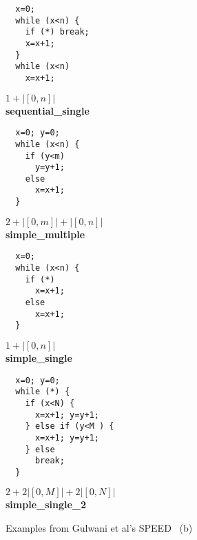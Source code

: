 \documentclass[nocopyrightspace,preprint]{sigplanconf}
\begin{document}
\begin{figure*}[t!]
 \setlength{\progwidth}{.24\linewidth}
  \centering
  \begin{minipage}[b]{\progwidth}
    \begin{center}
   \begin{lstlisting}
  x=0;
  while (x<n) {
    if (*) break;
    x=x+1;
  }
  while (x<n)
    x=x+1;
   \end{lstlisting}

$1 + |[0,n]|$
\\[.7\baselineskip]
      {\bf sequential\_single}
    \end{center}
  \end{minipage}
%
%
  \begin{minipage}[b]{\progwidth}
    \begin{center}
   \begin{lstlisting}
  x=0; y=0;
  while (x<n) {
    if (y<m)
      y=y+1;
    else
      x=x+1;
  }
   \end{lstlisting}
$2 + |[0, m]| + |[0, n]|$
\\[.7\baselineskip]
      {\bf simple\_multiple}
    \end{center}
  \end{minipage}
%
%
  \begin{minipage}[b]{\progwidth}
    \begin{center}
   \begin{lstlisting}
  x=0;
  while (x<n) {
    if (*)
      x=x+1;
    else 
      x=x+1;
  }
   \end{lstlisting}

$1 + |[0,n]|$
\\[.7\baselineskip]
      {\bf simple\_single}
    \end{center}
  \end{minipage}
%
%
  \begin{minipage}[b]{\progwidth}
    \begin{center}
   \begin{lstlisting}
  x=0; y=0;
  while (*) {
    if (x<N) {
      x=x+1; y=y+1;
    } else if (y<M ) {
      x=x+1; y=y+1;
    } else
      break;
  }
   \end{lstlisting}

$2 + 2 |[0, M]| + 2 |[0, N]|$
\\[.7\baselineskip]
      {\bf simple\_single\_2}
    \end{center}
  \end{minipage}

   \caption{Examples from Gulwani et al's SPEED~\cite{GulwaniMC09} (b)}
  \label{fig:cat2b}
\end{figure*}
\end{document}
